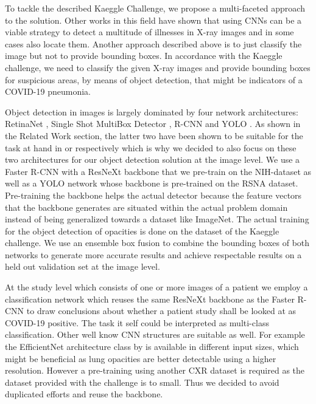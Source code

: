 To tackle the described Kaeggle Challenge, we propose a multi-faceted approach to the solution. Other works in this field have shown that using \acp{CNN} can be a viable strategy to detect a multitude of illnesses in X-ray images and in some cases also locate them. Another approach described above is to just classify the image but not to provide bounding boxes. In accordance with the Kaeggle challenge, we need to classify the given X-ray images and provide bounding boxes for suspicious areas, by means of object detection, that might be indicators of a COVID-19 pneumonia.

Object detection in images is largely dominated by four network architectures: RetinaNet \autocite{lin_focal_2018}, Single Shot MultiBox Detector \autocite{liu_ssd_2016}, \acl{R-CNN} \autocite{girshick_rich_2014} and \ac{YOLO} \autocite{yoloOriginal}. As shown in the Related Work section, the latter two have been shown to be suitable for the task at hand in \autocite{podder_efficient_2021} or \autocite{al2021fast} respectively which is why we decided to also focus on these two architectures for our object detection solution at the image level. We use a Faster \acs{R-CNN} with a ResNeXt backbone that we pre-train on the NIH-dataset as well as a \acs{YOLO} network whose backbone is pre-trained on the RSNA dataset. Pre-training the backbone helps the actual detector because the feature vectors that the backbone generates are situated within the actual problem domain instead of being generalized towards a dataset like ImageNet. The actual training for the object detection of opacities is done on the dataset of the Kaeggle challenge. We use an ensemble box fusion to combine the bounding boxes of both networks to generate more accurate results and achieve respectable results on a held out validation set at the image level.

At the study level which consists of one or more images of a patient we employ a classification network which reuses the same ResNeXt backbone as the Faster \ac{R-CNN} to draw conclusions about whether a patient study shall be looked at as COVID-19 positive. The task it self could be interpreted as multi-class classification. Other well know \ac{CNN} structures are suitable as well. For example the EfficientNet architecture class by \citeauthor{tan2019efficientnet} \autocite{tan2019efficientnet} is available in different input sizes, which might be beneficial as lung opacities are better detectable using a higher resolution. However a pre-training using another CXR dataset is required as the dataset provided with the challenge is to small. Thus we decided to avoid duplicated efforts and reuse the backbone.  

